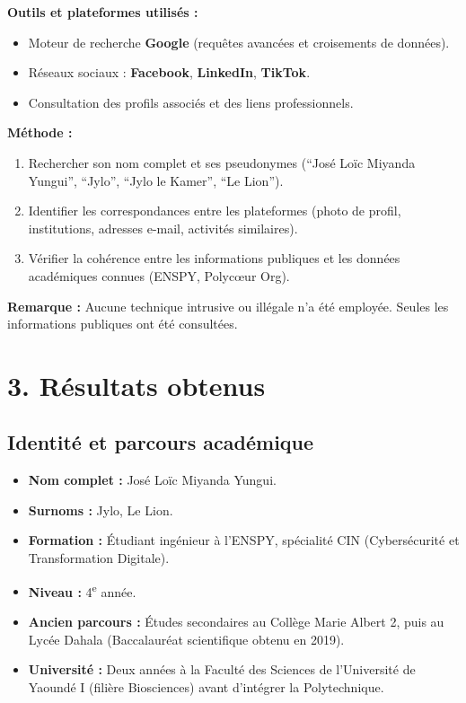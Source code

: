 \documentclass[12pt]{article}
\begin{document}
\textbf{Outils et plateformes utilisés :}
\begin{itemize}
    \item Moteur de recherche \textbf{Google} (requêtes avancées et croisements de données).
    \item Réseaux sociaux : \textbf{Facebook}, \textbf{LinkedIn}, \textbf{TikTok}.
    \item Consultation des profils associés et des liens professionnels.
\end{itemize}

\textbf{Méthode :}
\begin{enumerate}
    \item Rechercher son nom complet et ses pseudonymes (``José Loïc Miyanda Yungui'', ``Jylo'', ``Jylo le Kamer'', ``Le Lion'').
    \item Identifier les correspondances entre les plateformes (photo de profil, institutions, adresses e-mail, activités similaires).
    \item Vérifier la cohérence entre les informations publiques et les données académiques connues (ENSPY, Polycœur Org).
\end{enumerate}

\textbf{Remarque :} Aucune technique intrusive ou illégale n’a été employée. Seules les informations publiques ont été consultées.

\section*{3. Résultats obtenus}
\subsection*{Identité et parcours académique}
\begin{itemize}
    \item \textbf{Nom complet :} José Loïc Miyanda Yungui.
    \item \textbf{Surnoms :} Jylo, Le Lion.
    \item \textbf{Formation :} Étudiant ingénieur à l’ENSPY, spécialité CIN (Cybersécurité et Transformation Digitale).
    \item \textbf{Niveau :} 4\textsuperscript{e} année.
    \item \textbf{Ancien parcours :} Études secondaires au Collège Marie Albert 2, puis au Lycée Dahala (Baccalauréat scientifique obtenu en 2019).
    \item \textbf{Université :} Deux années à la Faculté des Sciences de l’Université de Yaoundé I (filière Biosciences) avant d’intégrer la Polytechnique.
\end{itemize}
\end{document}
